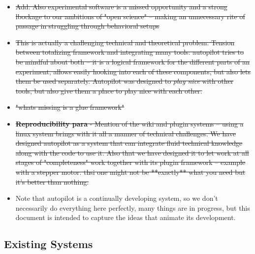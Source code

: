 \begin{itemize}
\item \sout{Add: Also experimental software is a missed opportunity and a strong lbockage to our ambitions of "open science" -- making an unnecessary rite of passage in struggling through behavioral setups}
\item \sout{This is actually a challenging technical and theoretical problem. Tension between totalizing framework and integrating many tools: autopilot tries to be mindful about both -- it is a logical framework for the different parts of an experiment, allows easily hooking into each of these components, but also lets them be used separately. Autopilot was designed to \textit{play nice} with other tools, but also give them a place to play nice with each other.}
\item \sout{"whats missing is a glue framework"}
\item \sout{\textbf{Reproducibility para} - Mention of the wiki and plugin systems -- using a linux system brings with it all a manner of technical challenges. We have designed autopilot as a system that can integrate fluid technical knowledge along with the code to use it. Also that we have designed it to let work at all stages of "completeness" work together with its plugin framework -- example with a stepper motor. thsi one might not be **exactly** what you need but it's better than nothing.}
\item Note that autopilot is a continually developing system, so we don't necessarily do everything here perfectly, many things are in progress, but this document is intended to capture the ideas that animate its development.
\end{itemize}

\subsection{Existing Systems}

